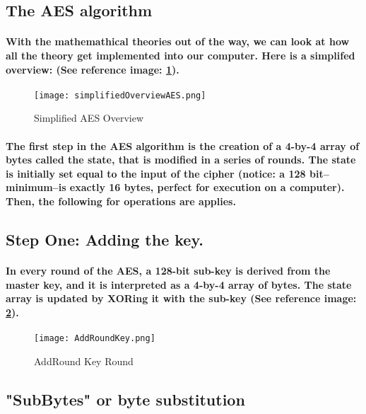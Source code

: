 \subsection{The AES algorithm}

\paragraph{With the mathemathical theories out of the way, we can look at how all the theory get implemented into our computer. Here is a simplifed overview: (See reference image: \ref{fig: AESovereview}).}



\begin{figure}
\centering
\texttt{[image: simplifiedOverviewAES.png]}
\caption{\label{fig: AESovereview} Simplified AES Overview}\cite[Webpage]{Crawford}
\end{figure}


\paragraph{The first step in the AES algorithm is the creation of a 4-by-4 array of bytes called the state, that is modified in a series of rounds. The state is initially set equal to the input of the cipher (notice: a 128 bit--minimum--is exactly 16 bytes, perfect for execution on a computer). Then, the following for operations are applies.}\cite[p. 186]{Katz}

\subsection{Step One: Adding the key.}
\paragraph{In every round of the AES, a 128-bit sub-key is derived from the master key, and it is interpreted as a 4-by-4 array of bytes. The state array is updated by XORing it with the sub-key (See reference image: \ref{fig: AddRoundKey}).}\cite[p. 186]{Katz}

\begin{figure}
\centering
\texttt{[image: AddRoundKey.png]}
\caption{\label{fig: AddRoundKey} AddRound Key Round}\cite[Webpage]{Crawford}
\end{figure}


\subsection{"SubBytes" or byte substitution}
